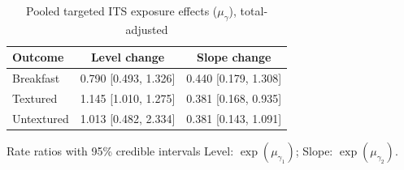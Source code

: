 \begin{table}[H]
\centering
\caption{Pooled targeted ITS exposure effects ($\mu_\gamma$), total-adjusted}
\label{tab:a4_mu_gamma_adj}
\begin{tabular}{lcc}
\toprule
Outcome & Level change & Slope change \\
\midrule
Breakfast & 0.790 [0.493, 1.326] & 0.440 [0.179, 1.308] \\
Textured & 1.145 [1.010, 1.275] & 0.381 [0.168, 0.935] \\
Untextured & 1.013 [0.482, 2.334] & 0.381 [0.143, 1.091] \\
\bottomrule
\end{tabular}
\par\smallskip\footnotesize Rate ratios with 95\% credible intervals Level: $\exp(\mu_{\gamma_1})$; Slope: $\exp(\mu_{\gamma_2})$.
\end{table}
